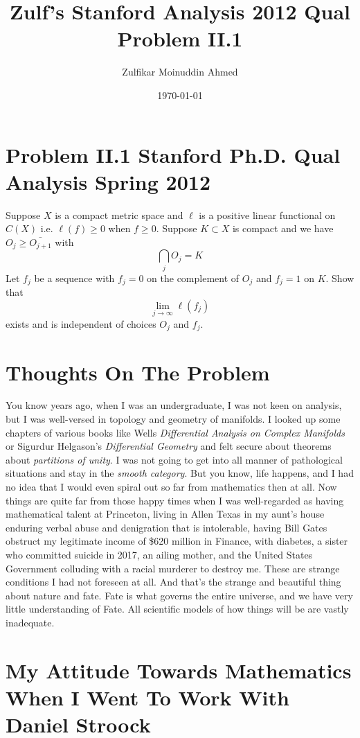\documentclass{amsart}
\title{Zulf's Stanford Analysis 2012 Qual Problem II.1}
\author{Zulfikar Moinuddin Ahmed}
\date{\today}
\begin{document}
\maketitle

\section{Problem II.1 Stanford Ph.D. Qual Analysis Spring 2012}
Suppose $X$ is a compact metric space and $\ell$ is a positive linear functional on $C(X)$ i.e. $\ell(f)\ge 0$ when $f\ge 0$.  Suppose $K \subset X$ is compact and we have $O_j \ge \bar{O_{j+1}}$ with 
\[
\bigcap_j O_j = K
\]
Let $f_j$ be a sequence with $f_j=0$ on the complement of $O_j$ and $f_j=1$ on $K$. Show that 
\[
\lim_{j\rightarrow \infty} \ell(f_j)
\]
exists and is independent of choices $O_j$ and $f_j$.

\section{Thoughts On The Problem}

You know years ago, when I was an undergraduate, I was not keen on analysis, but I was well-versed in topology and geometry of manifolds.  I looked up some chapters of various books like Wells {\em Differential Analysis on Complex Manifolds} or Sigurdur Helgason's {\em Differential Geometry} and felt secure about theorems about {\em partitions of unity}.  I was not going to get into all manner of pathological situations and stay in the {\em smooth category}.  But you know, life happens, and I had no idea that I would even spiral out so far from mathematics then at all.  Now things are quite far from those happy times when I was well-regarded as having mathematical talent at Princeton, living in Allen Texas in my aunt's house enduring verbal abuse and denigration that is intolerable, having Bill Gates obstruct my legitimate income of \$620 million in Finance, with diabetes, a sister who committed suicide in 2017, an ailing mother, and the United States Government colluding with a racial murderer to destroy me.  These are strange conditions I had not foreseen at all.  And that's the strange and beautiful thing about nature and fate.  Fate is what governs the entire universe, and we have very little understanding of Fate.  All scientific models of how things will be are vastly inadequate.

\section{My Attitude Towards Mathematics When I Went To Work With Daniel Stroock}
\end{document}
